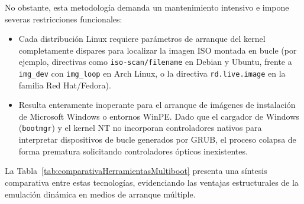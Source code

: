 \documentclass[12pt]{article}
\begin{document}
No obstante, esta metodología demanda un mantenimiento intensivo e impone severas restricciones funcionales:
\begin{itemize}[noitemsep, topsep=1pt]
    \item Cada distribución Linux requiere parámetros de arranque del kernel completamente dispares para localizar la imagen ISO montada en bucle (por ejemplo, directivas como \texttt{iso-scan/filename} en Debian y Ubuntu, frente a \texttt{img\_dev} con \texttt{img\_loop} en Arch Linux, o la directiva \texttt{rd.live.image} en la familia Red Hat/Fedora).
    \item Resulta enteramente inoperante para el arranque de imágenes de instalación de Microsoft Windows o entornos WinPE. Dado que el cargador de Windows (\texttt{bootmgr}) y el kernel NT no incorporan controladores nativos para interpretar dispositivos de bucle generados por GRUB, el proceso colapsa de forma prematura solicitando controladores ópticos inexistentes.
\end{itemize}

La Tabla~\ref{tab:comparativaHerramientasMultiboot} presenta una síntesis comparativa entre estas tecnologías, evidenciando las ventajas estructurales de la emulación dinámica en medios de arranque múltiple.
\end{document}
